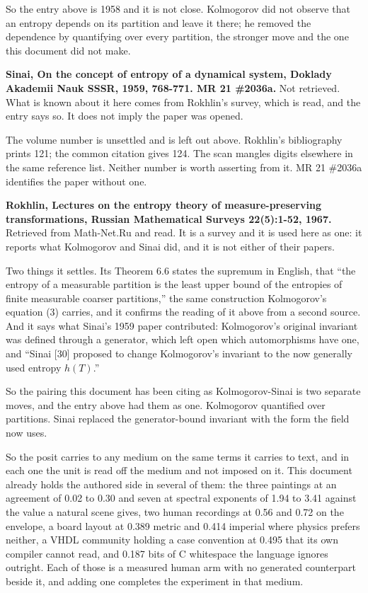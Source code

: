 So the entry above is 1958 and it is not close. Kolmogorov did not observe that an entropy depends on its partition and leave it there; he removed the dependence by quantifying over every partition, the stronger move and the one this document did not make.

\textbf{Sinai, On the concept of entropy of a dynamical system, Doklady Akademii Nauk SSSR, 1959, 768-771. MR 21 \#2036a.} Not retrieved. What is known about it here comes from Rokhlin's survey, which is read, and the entry says so. It does not imply the paper was opened.

The volume number is unsettled and is left out above. Rokhlin's bibliography prints 121; the common citation gives 124. The scan mangles digits elsewhere in the same reference list. Neither number is worth asserting from it. MR 21 \#2036a identifies the paper without one.

\textbf{Rokhlin, Lectures on the entropy theory of measure-preserving transformations, Russian Mathematical Surveys 22(5):1-52, 1967.} Retrieved from Math-Net.Ru and read. It is a survey and it is used here as one: it reports what Kolmogorov and Sinai did, and it is not either of their papers.

Two things it settles. Its Theorem 6.6 states the supremum in English, that ``the entropy of a measurable partition is the least upper bound of the entropies of finite measurable coarser partitions,'' the same construction Kolmogorov's equation (3) carries, and it confirms the reading of it above from a second source. And it says what Sinai's 1959 paper contributed: Kolmogorov's original invariant was defined through a generator, which left open which automorphisms have one, and ``Sinai [30] proposed to change Kolmogorov's invariant to the now generally used entropy \(h(T)\).''

So the pairing this document has been citing as Kolmogorov-Sinai is two separate moves, and the entry above had them as one. Kolmogorov quantified over partitions. Sinai replaced the generator-bound invariant with the form the field now uses.

So the posit carries to any medium on the same terms it carries to text, and in each one the unit is read off the medium and not imposed on it. This document already holds the authored side in several of them: the three paintings at an agreement of 0.02 to 0.30 and seven at spectral exponents of 1.94 to 3.41 against the value a natural scene gives, two human recordings at 0.56 and 0.72 on the envelope, a board layout at 0.389 metric and 0.414 imperial where physics prefers neither, a VHDL community holding a case convention at 0.495 that its own compiler cannot read, and 0.187 bits of C whitespace the language ignores outright. Each of those is a measured human arm with no generated counterpart beside it, and adding one completes the experiment in that medium.

